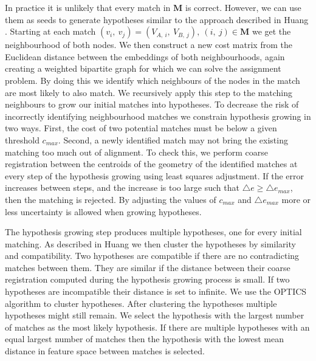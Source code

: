 In practice it is unlikely that every match in \(\mathbf{M}\) is correct. However, we can use them as seeds to generate hypotheses similar to the approach described in Huang \citep{huang_topological_2005}. Starting at each match \((v_i,\ v_j) = (V_{A,\ i},\ V_{B,\ j}),\ (i,\ j) \in \mathbf{M}\) we get the neighbourhood of both nodes. We then construct a new cost matrix from the Euclidean distance between the embeddings of both neighbourhoods, again creating a weighted bipartite graph for which we can solve the assignment problem. By doing this we identify which neighbours of the nodes in the match are most likely to also match. We recursively apply this step to the matching neighbours to grow our initial matches into hypotheses. To decrease the risk of incorrectly identifying neighbourhood matches we constrain hypothesis growing in two ways. First, the cost of two potential matches must be below a given threshold \(c_{max}\). Second, a newly identified match may not bring the existing matching too much out of alignment. To check this, we perform coarse registration between the centroids of the geometry of the identified matches at every step of the hypothesis growing using least squares adjustment. If the error increases between steps, and the increase is too large such that \(\triangle e \geq \triangle e_{max} \), then the matching is rejected. By adjusting the values of \(c_{max}\) and \(\triangle e_{max}\) more or less uncertainty is allowed when growing hypotheses.

The hypothesis growing step produces multiple hypotheses, one for every initial matching. As described in Huang \citep{huang_topological_2005} we then cluster the hypotheses by similarity and compatibility. Two hypotheses are compatible if there are no contradicting matches between them. They are similar if the distance between their coarse registration computed during the hypothesis growing process is small. If two hypotheses are incompatible their distance is set to infinite. We use the OPTICS algorithm to cluster hypotheses. After clustering the hypotheses multiple hypotheses might still remain. We select the hypothesis with the largest number of matches as the most likely hypothesis. If there are multiple hypotheses with an equal largest number of matches then the hypothesis with the lowest mean distance in feature space between matches is selected.
